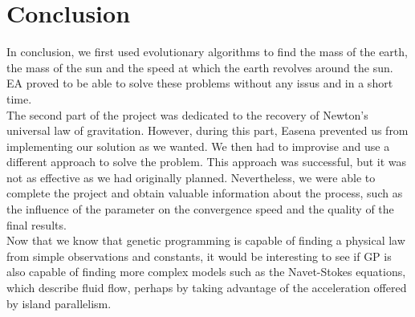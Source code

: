 \section{Conclusion}

In conclusion, we first used evolutionary algorithms to find the mass of the earth, the mass of the sun and the speed at which the earth revolves around the sun. EA proved to be able to solve these problems without any issus and in a short time.\\
The second part of the project was dedicated to the recovery of Newton's universal law of gravitation. However, during this part, Easena prevented us from implementing our solution as we wanted. We then had to improvise and use a different approach to solve the problem. This approach was successful, but it was not as effective as we had originally planned. Nevertheless, we were able to complete the project and obtain valuable information about the process, such as the influence of the parameter on the convergence speed and the quality of the final results.\\

Now that we know that genetic programming is capable of finding a physical law from simple observations and constants, it would be interesting to see if GP is also capable of finding more complex models such as the Navet-Stokes equations, which describe fluid flow, perhaps by taking advantage of the acceleration offered by island parallelism.\\
